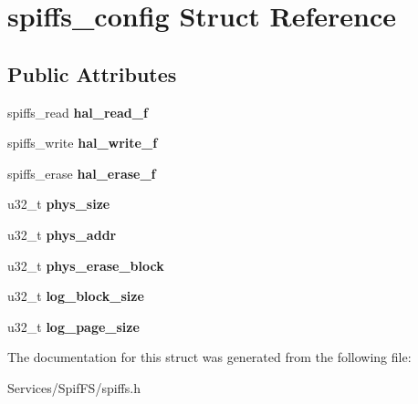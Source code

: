 \hypertarget{structspiffs__config}{}\section{spiffs\+\_\+config Struct Reference}
\label{structspiffs__config}
\subsection*{Public Attributes}
\begin{DoxyCompactItemize}
\item 
\hypertarget{structspiffs__config_a2d2cc2d17896ba4f5e78c524cd7da76b}{}spiffs\+\_\+read {\bfseries hal\+\_\+read\+\_\+f}\label{structspiffs__config_a2d2cc2d17896ba4f5e78c524cd7da76b}

\item 
\hypertarget{structspiffs__config_ab9402faf21097e938cb86b70efab38b4}{}spiffs\+\_\+write {\bfseries hal\+\_\+write\+\_\+f}\label{structspiffs__config_ab9402faf21097e938cb86b70efab38b4}

\item 
\hypertarget{structspiffs__config_a86af9c6671604e9c6e08cfe6c3fdfaeb}{}spiffs\+\_\+erase {\bfseries hal\+\_\+erase\+\_\+f}\label{structspiffs__config_a86af9c6671604e9c6e08cfe6c3fdfaeb}

\item 
\hypertarget{structspiffs__config_ad1746f2435254dd38ebdbf167a3289e0}{}u32\+\_\+t {\bfseries phys\+\_\+size}\label{structspiffs__config_ad1746f2435254dd38ebdbf167a3289e0}

\item 
\hypertarget{structspiffs__config_ad14f81b04bcc96bb09909015e06a5b3f}{}u32\+\_\+t {\bfseries phys\+\_\+addr}\label{structspiffs__config_ad14f81b04bcc96bb09909015e06a5b3f}

\item 
\hypertarget{structspiffs__config_a5d33e08b152880f482c976f897a1632f}{}u32\+\_\+t {\bfseries phys\+\_\+erase\+\_\+block}\label{structspiffs__config_a5d33e08b152880f482c976f897a1632f}

\item 
\hypertarget{structspiffs__config_afda08e08a059b922706188f6f2c557ac}{}u32\+\_\+t {\bfseries log\+\_\+block\+\_\+size}\label{structspiffs__config_afda08e08a059b922706188f6f2c557ac}

\item 
\hypertarget{structspiffs__config_a2525c28d372c9d46152b9997972c25fd}{}u32\+\_\+t {\bfseries log\+\_\+page\+\_\+size}\label{structspiffs__config_a2525c28d372c9d46152b9997972c25fd}

\end{DoxyCompactItemize}


The documentation for this struct was generated from the following file\+:\begin{DoxyCompactItemize}
\item 
Services/\+Spif\+F\+S/spiffs.\+h\end{DoxyCompactItemize}
